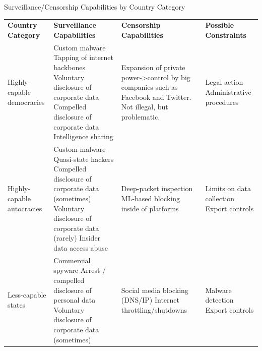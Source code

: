 \documentclass[nobackground,dvipsnames,table,aspectratio=169]{beamer}
\begin{document}
\begin{frame}{Surveillance/Censorship Capabilities by Country Category}
    \footnotesize %
    \begin{tabularx}{\textwidth}{|X|X|X|X|}
        \hline
        \textbf{Country Category} & \textbf{Surveillance Capabilities} & \textbf{Censorship Capabilities} & \textbf{Possible Constraints}\\
        Highly-capable democracies & Custom malware Tapping of internet backbones Voluntary disclosure of corporate data Compelled disclosure of corporate data Intelligence sharing & Expansion of private power->control by big companies such as Facebook and Twitter. Not illegal, but problematic. & Legal action Administrative procedures\\
        \hline
        \hline
        Highly-capable autocracies & Custom malware Quasi-state hackers Compelled disclosure of corporate data (sometimes) Voluntary disclosure of corporate data (rarely) Insider data access abuse & Deep-packet inspection ML-based blocking inside of platforms & Limits on data collection Export controls\\
        \hline
        Less-capable states & Commercial spyware Arrest / compelled disclosure of personal data Voluntary disclosure of corporate data (sometimes) & Social media blocking (DNS/IP) Internet throttling/shutdowns & Malware detection Export controls\\
        \hline
    \end{tabularx}
\end{frame}
\end{document}
